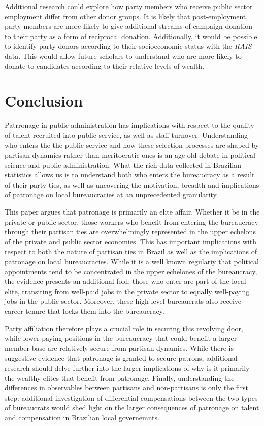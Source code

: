 Additional research could explore how party members who receive public sector employment differ from other donor groups. It is likely that post-employment, party members are more likely to give additional streams of campaign donation to their party as a form of reciprocal donation. Additionally, it would be possible to identify party donors according to their socioeconomic status with the \emph{RAIS} data. This would allow future scholars to understand who are more likely to donate to candidates according to their relative levels of wealth.

\section{Conclusion}
\label{sec:conclusion}

Patrronage in public administration has implications with respect to the quality of talent recruited into public service, as well as staff turnover. Understanding who enters the the public service and how these selection processes are shaped by partisan dynamics rather than meritocratic ones is an age old debate in political science and public administration. What the rich data collected in Brazilian statistics allows us is to understand both who enters the bureaucracy as a result of their party ties, as well as uncovering the motivation, breadth and implications of patronage on local bureaucracies at an unprecedented granularity.

This paper argues that patronage is primarily an elite affair. Whether it be in the private or public sector, those workers who benefit from entering the bureaucracy through their partisan ties are overwhelmingly represented in the upper echelons of the private and public sector economies. This has important implications with respect to both the nature of partisan ties in Brazil as well as the implications of patronage on local bureaucracies. While it is a well known regulariy that political appointments tend to be concentrated in the upper echelones of the bureaucracy, the evidence presents an additional fold: those who enter are part of the local elite, transiting from well-paid jobs in the private sector to equally well-paying jobs in the public sector. Moreover, these high-level bureaucrats also receive career tenure that locks them into the bureaucracy.

Party affiliation therefore plays a crucial role in securing this revolving door, while lower-paying positions in the bureaucracy that could benefit a larger member base are relatively secure from partisan dynamics. While there is suggestive evidence that patronage is granted to secure patrons, additional research should delve further into the larger implications of why is it primarily the wealthy elites that benefit from patronage. Finally, understanding the differences in observables between partisans and non-partisans is only the first step: additional investigation of differential compensations between the two types of bureaucrats would shed light on the larger consequences of patronage on talent and compensation in Brazilian local governemnts.

